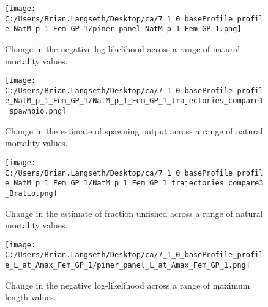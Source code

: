 \documentclass[11pt,
  english,
  a4paper,
]{article}
\begin{document}
\begin{figure}
\centering
\texttt{[image: C:/Users/Brian.Langseth/Desktop/ca/7\_1\_0\_baseProfile\_profile\_NatM\_p\_1\_Fem\_GP\_1/piner\_panel\_NatM\_p\_1\_Fem\_GP\_1.png]}
\caption{Change in the negative log-likelihood across a range of natural mortality values.\label{fig:m-profile}}
\end{figure}

\tagmcend\tagstructend


\begin{figure}
\centering
\texttt{[image: C:/Users/Brian.Langseth/Desktop/ca/7\_1\_0\_baseProfile\_profile\_NatM\_p\_1\_Fem\_GP\_1/NatM\_p\_1\_Fem\_GP\_1\_trajectories\_compare1\_spawnbio.png]}
\caption{Change in the estimate of spawning output across a range of natural mortality values.\label{fig:m-ssb}}
\end{figure}

\tagmcend\tagstructend


\begin{figure}
\centering
\texttt{[image: C:/Users/Brian.Langseth/Desktop/ca/7\_1\_0\_baseProfile\_profile\_NatM\_p\_1\_Fem\_GP\_1/NatM\_p\_1\_Fem\_GP\_1\_trajectories\_compare3\_Bratio.png]}
\caption{Change in the estimate of fraction unfished across a range of natural mortality values.\label{fig:m-depl}}
\end{figure}

\tagmcend\tagstructend


\begin{figure}
\centering
\texttt{[image: C:/Users/Brian.Langseth/Desktop/ca/7\_1\_0\_baseProfile\_profile\_L\_at\_Amax\_Fem\_GP\_1/piner\_panel\_L\_at\_Amax\_Fem\_GP\_1.png]}
\caption{Change in the negative log-likelihood across a range of maximum length values.\label{fig:linf-profile}}
\end{figure}

\tagmcend\tagstructend
\end{document}
